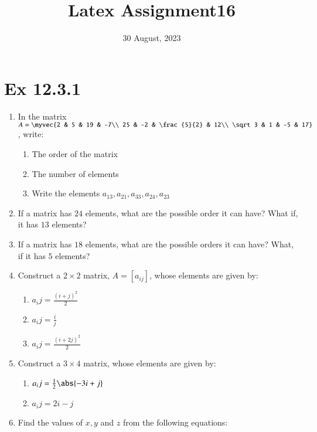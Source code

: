 \documentclass{article}
\theoremstyle{remark}
\begin{document}
\title{Latex Assignment16}
\date{30 August, 2023}
\maketitle
\section*{Ex 12.3.1}
\begin{enumerate}
\item In the matrix $A=\myvec
{2 & 5 & 19 & -7\\
25 & -2 & \frac{5}{2} & 12\\
\sqrt 3 & 1 & -5 & 17}$, write:
\begin{enumerate}[label=(\roman*)]
\item The order of the matrix
\item The number of elements
\item Write the elements $a_{13}, a_{21}, a_{33}, a_{24}, a_{23}$
\end{enumerate}
\item If a matrix has $24$ elements, what are the possible order it can have? What if, it has $13$ elements?
\item If a matrix has $18$ elements, what are the possible orders it can have? What, if it has $5$ elements?
\item Construct a $2\times 2$ matrix, $A=[a_{ij}]$, whose elements are given by:
\begin{enumerate}[label=(\roman*)]
\item $a_ij=\frac{(i+j)^2}{2}$
\item $a_ij=\frac{i}{j}$
\item $a_ij=\frac{(i+2j)^2}{2}$
\end{enumerate}
\item Construct a $3\times 4$ matrix, whose elements are given by:
\begin{enumerate}[label=(\roman*)]
\item $a_ij=\frac{1}{2}\abs{-3i+j}$
\item $a_ij=2i-j$
\end{enumerate}
\item Find the values of $x, y$ and $z$ from the following equations:
\end{enumerate}
\end{document}
